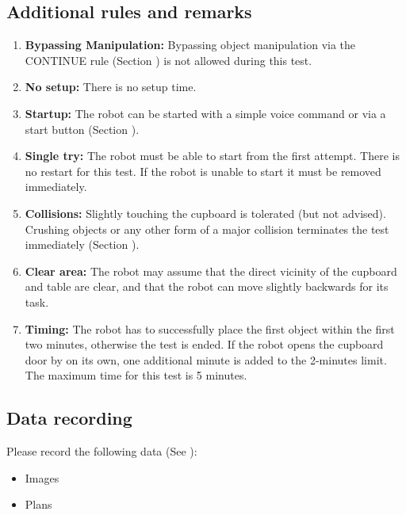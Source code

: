 
%
%
\subsection{Additional rules and remarks}
\begin{enumerate}
	\item \textbf{Bypassing Manipulation:} Bypassing object manipulation via the CONTINUE rule (Section ) is not allowed during this test.
	\item \textbf{No setup:} There is no setup time.
	\item \textbf{Startup:} The robot can be started with a simple voice command or via a start button (Section ).
	\item \textbf{Single try:} The robot must be able to start from the first attempt. There is no restart for this test. If the robot is unable to start it must be removed immediately.
	\item \textbf{Collisions:} Slightly touching the cupboard is tolerated (but not advised). Crushing objects or any other form of a major collision terminates the test immediately (Section ).
	\item \textbf{Clear area:} The robot may assume that the direct vicinity of the cupboard and table are clear, and that the robot can move slightly backwards for its task.
	\item \textbf{Timing:} The robot has to successfully place the first object within the first two minutes, otherwise the test is ended. If the robot opens the cupboard door by on its own, one additional minute is added to the 2-minutes limit. The maximum time for this test is 5 minutes.
\end{enumerate}

\subsection{Data recording}
Please record the following data (See ):
\begin{itemize}
	\item Images
	\item Plans
\end{itemize}

